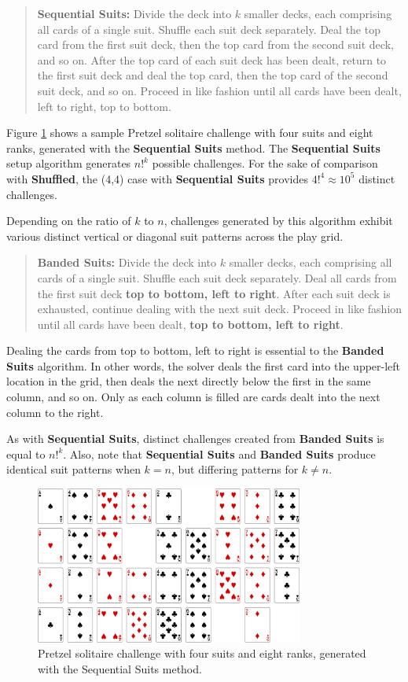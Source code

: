 \documentclass[journal]{IEEEtran}
\begin{document}
\begin{quote}
    {\bf Sequential Suits:} Divide the deck into $k$ smaller decks, each comprising all cards of a single suit. Shuffle each suit deck separately. Deal the top card from the first suit deck, then the top card from the second suit deck, and so on.  After the top card of each suit deck has been dealt, return to the first suit deck and deal the top card, then the top card of the second suit deck, and so on. Proceed in like fashion until all cards have been dealt, left to right, top to bottom.
\end{quote}

Figure \ref{fig:pretzelsequential} shows a sample Pretzel solitaire challenge with four suits and eight ranks, generated with the \textbf{Sequential Suits} method. The \textbf{Sequential Suits} setup algorithm generates $n!^{k}$ possible challenges. For the sake of comparison with \textbf{Shuffled}, the (4,4) case with \textbf{Sequential Suits} provides $4!^{4} \approx 10^{5}$ distinct challenges.

Depending on the ratio of $k$ to $n$, challenges generated by this algorithm exhibit various distinct vertical or diagonal suit patterns across the play grid.

\begin{quote}
    {\bf Banded Suits:} Divide the deck into $k$ smaller decks, each comprising all cards of a single suit. Shuffle each suit deck separately. Deal all cards from the first suit deck \textbf{top to bottom, left to right}. After each suit deck is exhausted, continue dealing with the next suit deck. Proceed in like fashion until all cards have been dealt, \textbf{top to bottom, left to right}.
\end{quote}

Dealing the cards from top to bottom, left to right is essential to the \textbf{Banded Suits} algorithm. In other words, the solver deals the first card into the upper-left location in the grid, then deals the next directly below the first in the same column, and so on. Only as each column is filled are cards dealt into the next column to the right.

As with \textbf{Sequential Suits}, distinct challenges created from \textbf{Banded Suits} is equal to $n!^{k}$. Also, note that \textbf{Sequential Suits} and \textbf{Banded Suits} produce identical suit patterns when $k = n$, but differing patterns for $k \neq n$.

\begin{figure}[t]
\centering
\includegraphics[width=8.8cm]{pretzel4x8.png}
\caption{Pretzel solitaire challenge with four suits and eight ranks, generated with the Sequential Suits method.}
\label{fig:pretzelsequential}
\end{figure}
\end{document}
